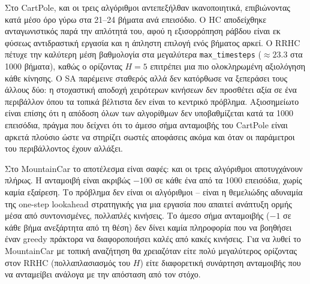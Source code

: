 \documentclass[12pt,a4paper]{article}
\begin{document}
Στο \textlatin{CartPole}, και οι τρεις αλγόριθμοι αντεπεξήλθαν ικανοποιητικά,
επιβιώνοντας κατά μέσο όρο γύρω στα 21--24 βήματα ανά επεισόδιο. Ο \textlatin{HC}
αποδείχθηκε ανταγωνιστικός παρά την απλότητά του, αφού η εξισορρόπηση ράβδου είναι
εκ φύσεως αντιδραστική εργασία και η άπληστη επιλογή ενός βήματος αρκεί. Ο \textlatin{RRHC}
πέτυχε την καλύτερη μέση βαθμολογία στα μεγαλύτερα \texttt{\textlatin{max\_timesteps}}
($\approx 23.3$ στα 1000 βήματα), καθώς ο ορίζοντας $H=5$ επιτρέπει μια πιο
ολοκληρωμένη αξιολόγηση κάθε κίνησης. Ο \textlatin{SA} παρέμεινε σταθερός αλλά δεν
κατόρθωσε να ξεπεράσει τους άλλους δύο: η στοχαστική αποδοχή χειρότερων κινήσεων
δεν προσθέτει αξία σε ένα περιβάλλον όπου τα τοπικά βέλτιστα δεν είναι το κεντρικό
πρόβλημα. Αξιοσημείωτο είναι επίσης ότι η απόδοση όλων των αλγορίθμων δεν υποβαθμίζεται
κατά τα 1000 επεισόδια, πράγμα που δείχνει ότι το άμεσο σήμα ανταμοιβής του
\textlatin{CartPole} είναι αρκετά πλούσιο ώστε να στηρίζει σωστές αποφάσεις
ακόμα και όταν οι παράμετροι του περιβάλλοντος έχουν αλλάξει.

Στο \textlatin{MountainCar} το αποτέλεσμα είναι σαφές: και οι τρεις αλγόριθμοι
αποτυγχάνουν πλήρως. Η ανταμοιβή είναι ακριβώς $-100$ σε κάθε ένα από τα 1000
επεισόδια, χωρίς καμία εξαίρεση. Το πρόβλημα δεν είναι οι αλγόριθμοι -- είναι η
θεμελιώδης αδυναμία της \textlatin{one-step lookahead} στρατηγικής για μια εργασία
που απαιτεί ανάπτυξη ορμής μέσα από συντονισμένες, πολλαπλές κινήσεις. Το άμεσο
σήμα ανταμοιβής ($-1$ σε κάθε βήμα ανεξάρτητα από τη θέση) δεν δίνει καμία
πληροφορία που να βοηθήσει έναν \textlatin{greedy} πράκτορα να διαφοροποιήσει καλές
από κακές κινήσεις. Για να λυθεί το \textlatin{MountainCar} με τοπική αναζήτηση θα
χρειαζόταν είτε πολύ μεγαλύτερος ορίζοντας στον \textlatin{RRHC} (πολλαπλασιασμός
του $H$) είτε διαφορετική συνάρτηση ανταμοιβής που να ανταμείβει ανάλογα με την
απόσταση από τον στόχο.
\end{document}
